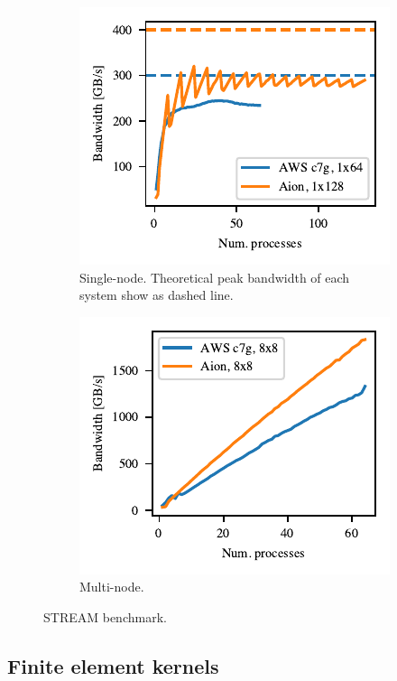 \begin{figure}
    \begin{subfigure}{.5\textwidth}
        \includegraphics{chapters/chp1/graphics/stream_plots/stream_single_node.pdf}
	\caption{Single-node. Theoretical peak bandwidth of each system show as dashed line.}
        \label{fig:stream-single}
    \end{subfigure}%
    \begin{subfigure}{.5\textwidth}
        \includegraphics{chapters/chp1/graphics/stream_plots/stream_multi_node.pdf}
        \caption{Multi-node.}
        \label{fig:stream-multiple}
    \end{subfigure}
    \caption{STREAM benchmark.}
\end{figure}

\subsection*{Finite element kernels}

